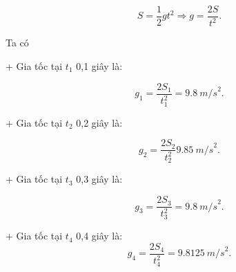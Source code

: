 \begin{enumerate}[label=\bfseries Câu \arabic*:]
{\begin{enumerate}[label=\alph*)]
			$$S = \dfrac{1}{2}gt^2 \Rightarrow g = \dfrac{2S}{t^2}.$$
			
			Ta có
			
			+ Gia tốc tại $t_1$  0,1 giây là: 
			
			$$g_1 = \dfrac{2 S_1}{t_1^2}= \SI{9,8}{m/s}^2.$$
				
			+ Gia tốc tại $t_2$ 0,2 giây là: 
			
			$$g_2 = \dfrac{2 S_2}{t_2^2}\SI{9,85}{m/s}^2.$$
					
			+ Gia tốc tại $t_3$ 0,3 giây là: 
			
			$$g_3 = \dfrac{2 S_3}{t_3^2}=\SI{9,8}{m/s}^2.$$
			
			+ Gia tốc tại $t_4$ 0,4 giây là: 
			$$g_4 = \dfrac{2S_4}{t_4^2}=\SI{9,8125}{m/s}^2.$$
			
			
		\end{enumerate}
	}
\end{enumerate}